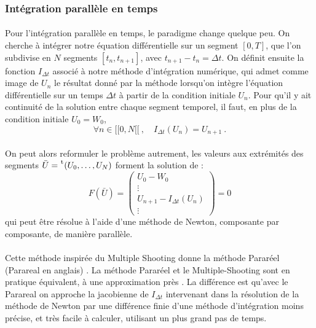     \subsubsection{Intégration parallèle en temps}

      \paragraph{}
      Pour l'intégration parallèle en temps, le paradigme change quelque peu.
      On cherche à intégrer notre équation différentielle sur un segment $\left[0, T\right]$, que l'on subdivise en $N$ segments $\left[t_n, t_{n+1}\right]$, avec $t_{n+1} - t_n = \Delta t$.
      On définit ensuite la fonction $I_{\Delta t}$ associé à notre méthode d'intégration numérique, qui admet comme image de $U_n$ le résultat donné par la méthode lorsqu'on intègre l'équation différentielle sur un temps $\Delta t$ à partir de la condition initiale $U_n$.
      Pour qu'il y ait continuité de la solution entre chaque segment temporel, il faut, en plus de la condition initiale $U_0 = W_0$,
      \[\forall n\in  [\![0, N[\![\ ,\quad I_{\Delta t}\left(U_n\right) = U_{n+1}\ .\]

      \paragraph{}
      On peut alors reformuler le problème autrement, les valeurs aux extrémités des segments $\bar{U} = \mskip1mu\prescript{\smash{\mathrm t\mkern-3mu}}{}{\mathstrut\left(U_0, \dots, U_N\right)}$ forment la solution de :
      \[F\left(\bar{U}\right) = \begin{pmatrix}U_0 - W_0 \\ \vdots \\ U_{n+1} - I_{\Delta t}\left(U_n\right) \\ \vdots\end{pmatrix} = 0\]
      qui peut être résolue à l'aide d'une méthode de Newton, composante par composante, de manière parallèle.

      \paragraph{}
      Cette méthode inspirée du Multiple Shooting \cite{Nievergelt1964} donne la méthode Pararéel (Parareal en anglais) \cite{LionsMadayTurinici2001}.
      La méthode Pararéel et le Multiple-Shooting sont en pratique équivalent, à une approximation près \cite{GanderVandewalle2007}.
      La différence est qu'avec le Parareal on approche la jacobienne de $I_{\Delta t}$ intervenant dans la résolution de la méthode de Newton par une différence finie d'une méthode d'intégration moins précise, et très facile à calculer, utilisant un plus grand pas de temps.

